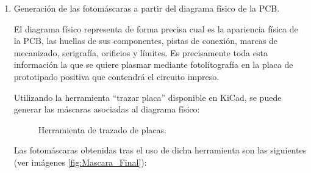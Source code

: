 \begin{enumerate}
    \item Generación de las fotomáscaras a partir del diagrama físico de la \ac{PCB}.
    
    El diagrama físico representa de forma precisa cual es la apariencia física de la \ac{PCB}, las huellas de sus componentes, pistas de conexión, marcas de mecanizado, serigrafía, orificios y límites. Es precisamente toda esta información la que se quiere plasmar mediante fotolitografía en la placa de prototipado positiva que contendrá el circuito impreso.
    
    Utilizando la herramienta ``trazar placa'' disponible en KiCad, se puede generar las máscaras asociadas al diagrama físico:
    
    \begin{figure}[H]
    \centering
    \caption{Herramienta de trazado de placas.} 
    \end{figure}
    
    Las fotomáscaras obtenidas tras el uso de dicha herramienta son las siguientes (ver imágenes \ref{fig:Mascara_Final}):
    

\end{enumerate}
